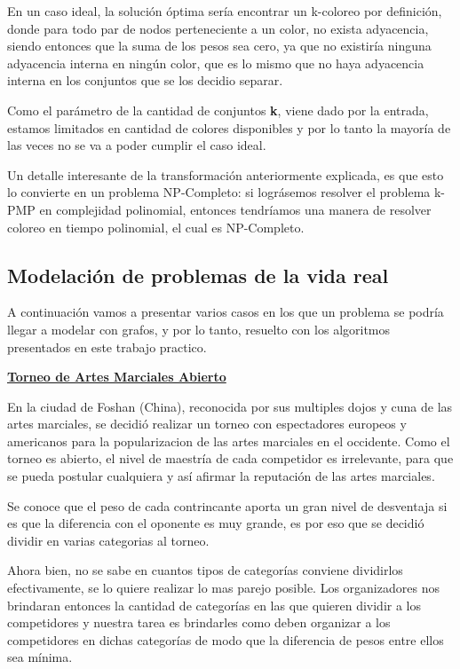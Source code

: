 \documentclass[10pt,a4paper]{article}
\begin{document}
En un caso ideal, la solución óptima sería encontrar un k-coloreo por definición, donde para todo par de nodos perteneciente a un color, no exista adyacencia, siendo entonces que la suma de los pesos sea cero, ya que no existiría ninguna adyacencia interna en ningún color, que es lo mismo que no haya adyacencia interna en los conjuntos que se los decidio separar.

Como el parámetro de la cantidad de conjuntos \textbf{k}, viene dado por la entrada, estamos limitados en cantidad de colores disponibles y por lo tanto la mayoría de las veces no se va a poder cumplir el caso ideal. 

Un detalle interesante de la transformación anteriormente explicada, es que esto lo convierte en un problema NP-Completo: si lográsemos resolver el problema k-PMP en complejidad polinomial, entonces tendríamos una manera de resolver coloreo en tiempo polinomial, el cual es NP-Completo.

\newpage
\subsection{Modelación de problemas de la vida real}
A continuación vamos a presentar varios casos en los que un problema se podría llegar a modelar con grafos, y por lo tanto, resuelto con los algoritmos presentados en este trabajo practico.

\bigskip
\noindent \underline{\textbf{Torneo de Artes Marciales Abierto}}

En la ciudad de Foshan (China), reconocida por sus multiples dojos y cuna de las artes marciales, se decidió realizar un torneo con espectadores europeos y americanos para la popularizacion de las artes marciales en el occidente. Como el torneo es abierto, el nivel de maestría de cada competidor es irrelevante, para que se pueda postular cualquiera y así afirmar la reputación de las artes marciales. 

Se conoce que el peso de cada contrincante aporta un gran nivel de desventaja si es que la diferencia con el oponente es muy grande, es por eso que se decidió dividir en varias categorias al torneo.

Ahora bien, no se sabe en cuantos tipos de categorías conviene dividirlos efectivamente, se lo quiere realizar lo mas parejo posible. Los organizadores nos brindaran entonces la cantidad de categorías en las que quieren dividir a los competidores y nuestra tarea es brindarles como deben organizar a los competidores en dichas categorías de modo que la diferencia de pesos entre ellos sea mínima.
\end{document}
